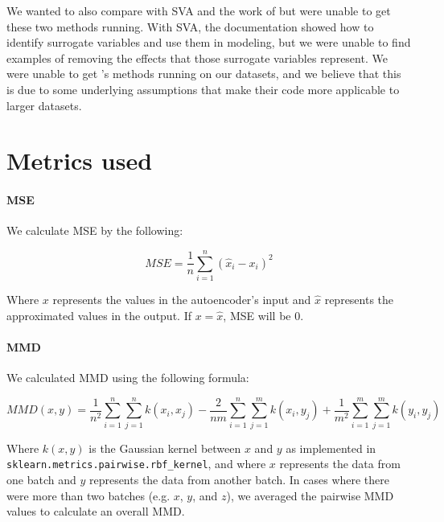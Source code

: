 \documentclass{article}
\begin{document}
We wanted to also compare with SVA \cite{leek_capturing_2007} and the work of \citet{shaham_removal_2017} \citep{shaham_removal_2017,shaham_batch_2018} but were unable to get these two methods running.
With SVA, the documentation showed how to identify surrogate variables and use them in modeling, but we were unable to find examples of removing the effects that those surrogate variables represent.
We were unable to get \citet{shaham_removal_2017}'s methods running on our datasets, and we believe that this is due to some underlying assumptions that make their code more applicable to larger datasets.

\section{Metrics used}

\paragraph{MSE}

We calculate MSE by the following:

\begin{equation}
	\label{mse}
	MSE = \frac{1}{n}\sum_{i=1}^n{(\hat{x}_i - x_i)^2}
\end{equation}

Where $x$ represents the values in the autoencoder's input and $\hat{x}$ represents the approximated values in the output.
If $x = \hat{x}$, MSE will be 0.

\paragraph{MMD}

We calculated MMD using the following formula:

\begin{equation}
	\label{mmd}
	MMD(x, y) = \frac{1}{n^2}\sum_{i=1}^n{\sum_{j=1}^n{k(x_i, x_j)}} - \frac{2}{nm}\sum_{i=1}^n{\sum_{j=1}^m{k(x_i, y_j)}} + \frac{1}{m^2}\sum_{i=1}^m{\sum_{j=1}^m{k(y_i, y_j)}}
\end{equation}

Where $k(x, y)$ is the Gaussian kernel between $x$ and $y$ as implemented in \texttt{sklearn.metrics.pairwise.rbf\_kernel}, and where $x$ represents the data from one batch and $y$ represents the data from another batch.
In cases where there were more than two batches (e.g. $x$, $y$, and $z$), we averaged the pairwise MMD values to calculate an overall MMD.
\end{document}
